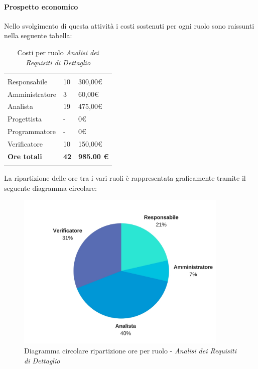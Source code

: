 			\paragraph{Prospetto economico}
			Nello svolgimento di questa attività i costi sostenuti per ogni ruolo sono raissunti nella seguente tabella:
			\begin{table}[H]
			\centering
			\begin{tabular}{|p{4cm}|C{4cm}|C{4cm}|}
				
				 & &\\
				Responsabile & 10 & 300,00\euro \\
				\hline
				Amministratore& 3 & 60,00\euro \\
				\hline
				Analista & 19 & 475,00\euro \\
				\hline
				Progettista & - & 0\euro \\
				\hline
				Programmatore & - & 0\euro \\
				\hline
				Verificatore & 10 & 150,00\euro \\
				\hline
				\textbf{Ore totali} & \textbf{42} & \textbf{985.00 \euro} \\
			\end{tabular}
			\caption{Costi per ruolo \textit{Analisi dei Requisiti di Dettaglio}}
		\end{table}
		
		La ripartizione delle ore tra i vari ruoli è rappresentata graficamente tramite il seguente diagramma circolare:

			\begin{figure}[h] 
			\centering 
			\includegraphics[width=0.9\textwidth]{images/CircolareAnalisiRequisitiDiDettaglio.jpg} 
			\caption{Diagramma circolare ripartizione ore per ruolo - \textit{Analisi dei Requisiti di Dettaglio}}
			\label{CircolareAnalisiRequisitiDiDettaglio}
			\end{figure}
		


